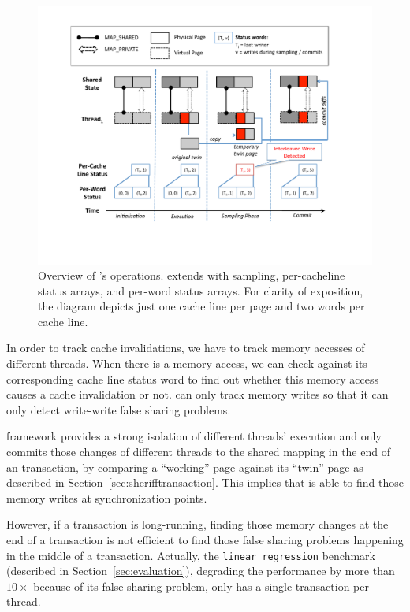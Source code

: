 \begin{figure}[!t]
\centering
\includegraphics[width=5in]{sheriff/figure/sheriffdetective.pdf}
\caption{
Overview of \SheriffDetect{}’s operations. \SheriffDetect{} extends \Sheriff{} with sampling, per-cacheline status arrays, and per-word status arrays. For clarity of
exposition, the diagram depicts just one cache line per page and two words per cache line.\label{fig:sheriffdetect}}
\end{figure}

In order to track cache invalidations, we have to track memory accesses of different threads. When there is a memory access, we can check against its corresponding cache line status word to find out whether this memory access causes a cache invalidation or not. \SheriffDetect{} can only track memory writes so that it can only detect write-write false sharing problems. 

\sheriff{} framework provides a strong isolation of different threads' execution and only commits those changes of different threads to the shared mapping in the end of an transaction, by comparing a ``working'' page against its ``twin'' page as described in Section~\ref{sec:sherifftransaction}.
This implies that \sheriff{} is able to find those memory writes at synchronization points. 

However, if a transaction is long-running, finding those memory changes at the end of a transaction is not efficient to find those false sharing problems happening in the middle of a transaction. Actually, the \texttt{linear\_regression} benchmark (described in Section~\ref{sec:evaluation}), degrading the performance by more than $10\times$ because of its false sharing problem, only has a single transaction per thread. 

